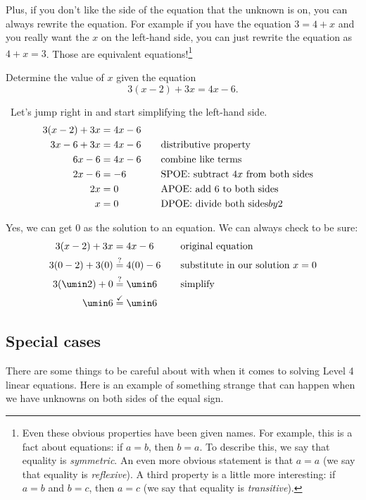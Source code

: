 Plus, if you don't like the side of the equation that the unknown is on, you can always rewrite the equation. For example if you have the equation $3=4+x$ and you really want the $x$ on the left-hand side, you can just rewrite the equation as $4+x=3$. Those are equivalent equations!\footnote{Even these obvious properties have been given names. For example, this is a fact about equations: if $a=b$, then $b=a$. To describe this, we say that equality is \textit{symmetric}. An even more obvious statement is that $a=a$ (we say that equality is \textit{reflexive}). A third property is a little more interesting: if $a=b$ and $b=c$, then $a=c$ (we say that equality is \textit{transitive}). }

\begin{boxedex}
Determine the value of $x$ given the equation \[3(x-2)+3x=4x-6.\]

\exsoln\ Let's jump right in and start simplifying the left-hand side.
\[\begin{aligned}
3(x-2)+3x &= 4x-6\\
3x-6+3x &= 4x-6
&&\text{\quad distributive property}\\
6x-6 &= 4x-6
&&\text{\quad combine like terms}\\
2x-6 &= -6
&&\text{\quad SPOE: subtract $4x$ from both sides}\\
2x &= 0
&&\text{\quad APOE: add 6 to both sides}\\
x &= 0
&&\text{\quad DPOE: divide both sides} by 2\\
\end{aligned}\]

Yes, we can get 0 as the solution to an equation. We can always check to be sure:
\[\begin{aligned}
3(x-2)+3x &= 4x-6
&& \text{\quad original equation}\\
3(0-2)+3(0) &\overset{?}{=} 4(0)-6
&& \text{\quad substitute in our solution $x = 0$}\\
3(\umin2)+0 &\overset{?}{=} \umin6
&& \text{\quad simplify}\\
\umin6 &\overset{\checkmark}{=} \umin6\\
\end{aligned}\]
\end{boxedex}

\subsection{Special cases}

There are some things to be careful about with when it comes to solving Level 4 linear equations. Here is an example of something strange that can happen when we have unknowns on both sides of the equal sign.

